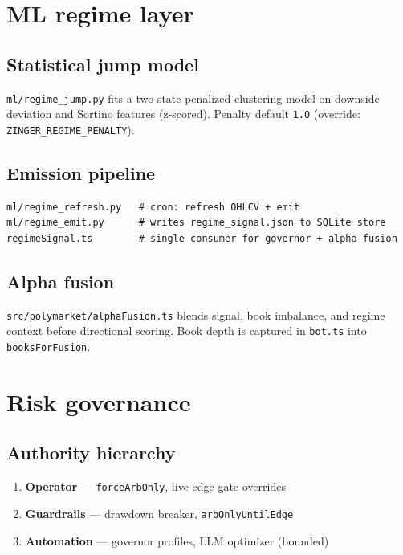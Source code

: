 \documentclass[11pt,a4paper]{report}
\begin{document}
\chapter{ML regime layer}

\section{Statistical jump model}

\texttt{ml/regime\_jump.py} fits a two-state penalized clustering model on downside deviation
and Sortino features (z-scored). Penalty default \texttt{1.0} (override:
\texttt{ZINGER\_REGIME\_PENALTY}).

\section{Emission pipeline}

\begin{verbatim}
ml/regime_refresh.py   # cron: refresh OHLCV + emit
ml/regime_emit.py      # writes regime_signal.json to SQLite store
regimeSignal.ts        # single consumer for governor + alpha fusion
\end{verbatim}

\section{Alpha fusion}

\texttt{src/polymarket/alphaFusion.ts} blends signal, book imbalance, and regime context
before directional scoring. Book depth is captured in \texttt{bot.ts} into
\texttt{booksForFusion}.

\chapter{Risk governance}

\section{Authority hierarchy}

\begin{enumerate}
  \item \textbf{Operator} --- \texttt{forceArbOnly}, live edge gate overrides
  \item \textbf{Guardrails} --- drawdown breaker, \texttt{arbOnlyUntilEdge}
  \item \textbf{Automation} --- governor profiles, LLM optimizer (bounded)
\end{enumerate}
\end{document}
